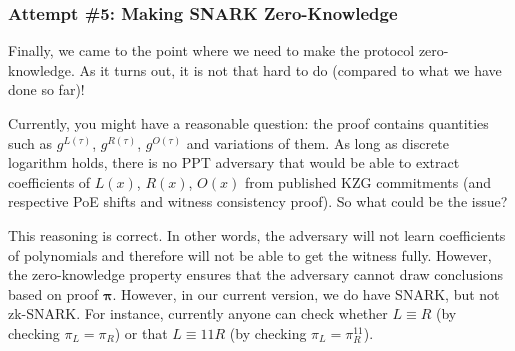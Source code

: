 \documentclass[../lecture-notes.tex]{subfiles}
\begin{document}
\subsubsection*{Attempt \#5: Making SNARK Zero-Knowledge}

Finally, we came to the point where we need to make the protocol zero-knowledge. As it turns out, it is not that hard to do (compared to what we have done so far)!

\begin{remark}
    Currently, you might have a reasonable question: the proof contains quantities such as $g^{L(\tau)}$, $g^{R(\tau)}$, $g^{O(\tau)}$ and variations of them. As long as discrete logarithm holds, there is no PPT adversary that would be able to extract coefficients of $L(x)$, $R(x)$, $O(x)$ from published KZG commitments (and respective PoE shifts and witness consistency proof). So what could be the issue?

    This reasoning is correct. In other words, the adversary will not learn coefficients of polynomials and therefore will not be able to get the witness fully. However, the zero-knowledge property ensures that the adversary cannot draw conclusions based on proof $\boldsymbol{\pi}$. However, in our current version, we do have SNARK, but not zk-SNARK. For instance, currently anyone can check whether $L \equiv R$ (by checking $\pi_L = \pi_R$) or that $L \equiv 11R$ (by checking $\pi_L = \pi_R^{11}$).  
\end{remark}
\end{document}
